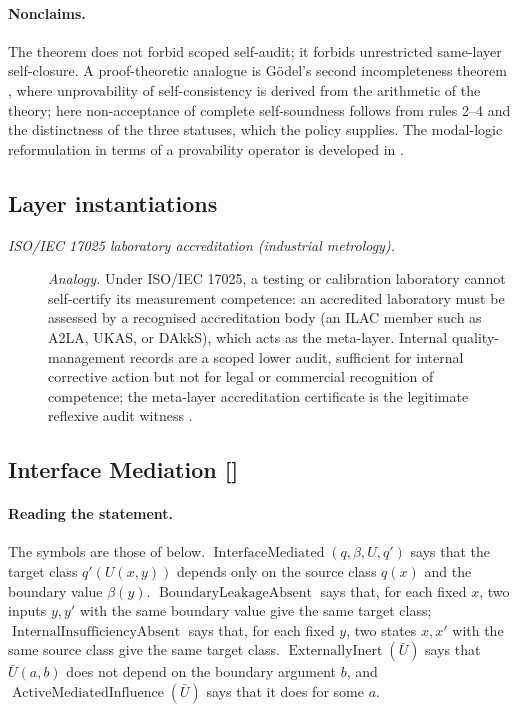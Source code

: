 \paragraph{Nonclaims.} The theorem does not forbid scoped self-audit; it forbids unrestricted
same-layer self-closure.  A proof-theoretic analogue is G\"odel's second
incompleteness theorem \citep{Godel1931Unentscheidbare}, where unprovability
of self-consistency is derived from the arithmetic of the theory; here
non-acceptance of complete self-soundness follows from rules 2--4 and the
distinctness of the three statuses, which
the policy supplies. The modal-logic reformulation in
terms of a provability operator is developed in
\citet{Boolos1993LogicProvability}.

\subsection*{Layer instantiations}\label{layer-inst:F21}

\begingroup\small
\begin{description}
\item[\emph{{ISO}/{IEC} 17025 laboratory accreditation
(industrial metrology).}] \textit{Analogy.}
Under ISO/IEC 17025, a testing or calibration laboratory
cannot self-certify its measurement competence: an
accredited laboratory must be assessed by a recognised
accreditation body (an ILAC member such as A2LA, UKAS, or
DAkkS), which acts as the meta-layer.  Internal
quality-management records are a scoped lower audit,
sufficient
for internal corrective action but not for legal or
commercial recognition of competence; the meta-layer
accreditation certificate is the legitimate reflexive
audit witness \citep{ISOIEC17025_2017}.

\end{description}
\endgroup


\subsection{Interface Mediation [\texorpdfstring{}{F22}]}\label{sec:status-records-coherence:interface-mediation}

\paragraph{Reading the statement.} The symbols are those of  below.
\(\operatorname{InterfaceMediated}(q,\beta,U,q')\) says that the target
class \(q'(U(x,y))\) depends only on the source class \(q(x)\) and the
boundary value \(\beta(y)\). \(\operatorname{BoundaryLeakageAbsent}\)
says that, for each fixed \(x\), two inputs \(y,y'\) with the same
boundary value give the same target class;
\(\operatorname{InternalInsufficiencyAbsent}\) says that, for each
fixed \(y\), two states \(x,x'\) with the same source class give the
same target class. \(\operatorname{ExternallyInert}(\bar U)\) says that
\(\bar U(a,b)\) does not depend on the boundary argument \(b\), and
\(\operatorname{ActiveMediatedInfluence}(\bar U)\) says that it does
for some \(a\).

